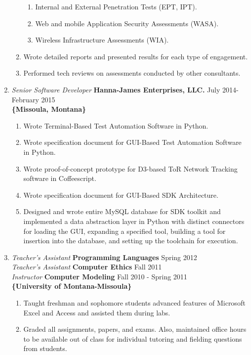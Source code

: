 \documentclass[oneside]{article}%
\begin{document}
\begin{enumerate}[]
\begin{enumerate}[*]
\begin{enumerate}[.]
					\item Internal and External Penetration Tests (EPT, IPT).					
					\item Web and mobile Application Security Assessments (WASA).
					\item Wireless Infrastructure Assessments (WIA).
				\end{enumerate}
			\item Wrote detailed reports and presented results for each type of engagement.
			\item Performed tech reviews on assessments conducted by other consultants.
		\end{enumerate}
	\item \textit{Senior Software Developer} \textbf{Hanna-James Enterprises, LLC.} \hfill July 2014-February 2015\\
		\textbf{\{Missoula, Montana\}}
		\begin{enumerate}[*]
			\item Wrote Terminal-Based Test Automation Software in Python.
			\item Wrote specification document for GUI-Based Test Automation Software in Python.
			\item Wrote proof-of-concept prototype for D3-based ToR Network Tracking software in Coffeescript.
			\item Wrote specification document for GUI-Based SDK Architecture.
			\item Designed and wrote entire MySQL database for SDK toolkit and implemented a data abstraction layer in Python with distinct connectors for loading the GUI, expanding a specified tool, building a tool for insertion into the database, and setting up the toolchain for execution.
		\end{enumerate}
	\item \textit{Teacher's Assistant} \textbf{Programming Languages} \hfill Spring 2012\\
		\textit{Teacher's Assistant} \textbf{Computer Ethics} \hfill Fall 2011\\
		\textit{Instructor} \textbf{Computer Modeling} \hfill Fall 2010 - Spring 2011\\
		\textbf{\{University of Montana-Missoula\}}
		\begin{enumerate}[*]
			\item Taught freshman and sophomore students advanced features of Microsoft Excel and Access and assisted them during labs.
			\item Graded all assignments, papers, and exams. Also, maintained office hours to be available out of class for individual tutoring and fielding questions from students.
		\end{enumerate}
\end{enumerate}
\end{document}
